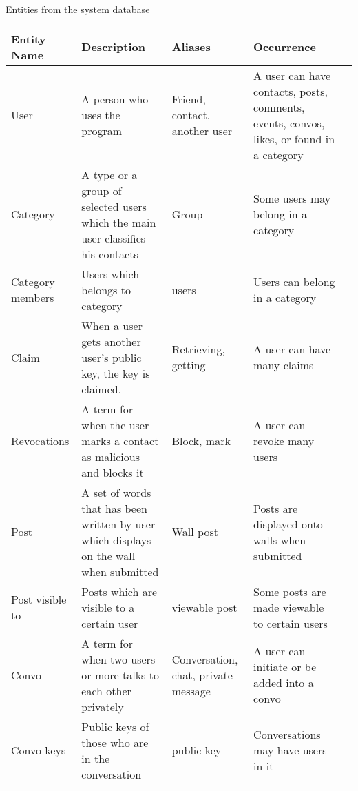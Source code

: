 Entities from the system database
\begin{center}
    \begin{tabular}{| l | l | l | l | l |}
    \hline
    Entity Name      & Description                                                                                              & Aliases                             & Occurrence                                     \\ \hline
    User             & A person who uses the program                                                                            & Friend, contact, another user       & A user can have contacts, posts, comments, events, convos, likes, or found in a category                                              \\ \hline
    Category         & A type or a group of selected users which the main user classifies his contacts        & Group                               & Some users may belong in a category           \\ \hline
    Category members & Users which belongs to category                                                        & users                             &  Users can belong in a category          \\ \hline
    Claim            & When a user gets another user's public key, the key is claimed.                        & Retrieving, getting                 & A user can have many claims                   \\ \hline
    Revocations      & A term for when the user marks a contact as malicious and blocks it                    & Block, mark                         & A user can revoke many users                  \\ \hline
    Post             & A set of words that has been written by user which displays on the wall when submitted & Wall post                           & Posts are displayed onto walls when submitted \\ \hline
    Post visible to  & Posts which are visible to a certain user  & viewable post                             & Some posts are made viewable to certain users         \\ \hline
    Convo            & A term for when two users or more talks to each other privately                        & Conversation, chat, private message & A user can initiate or be added into a convo  \\ \hline
    Convo keys       & Public keys of those who are in the conversation                                       & public key                        & Conversations may have users in it       \\ \hline

\end{tabular}
\end{center}
